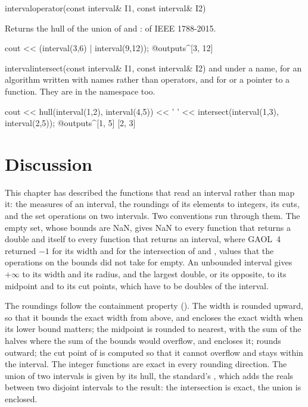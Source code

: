 \documentclass[12pt,a4paper,twoside,openright]{book}
\begin{document}
\begin{deffun}{interval}{operator\textbar}{(const interval\& I1, const interval\& I2)}
  \begin{operation}
  \end{operation}
  Returns the hull of the union of  and : 
  of IEEE 1788-2015.
  \begin{example}
cout << (interval(3,6) | interval(9,12));
@outputs^[3, 12]~
  \end{example}
\end{deffun}

\begin{deffun}{interval}{intersect}{(const interval\& I1, const interval\& I2)}
   and  under a name, for an algorithm written
  with names rather than operators, and for  or a
  pointer to a function. They are in the namespace 
  too.\newinvfive
  \begin{example}
cout << hull(interval(1,2), interval(4,5)) << ' '
     << intersect(interval(1,3), interval(2,5));
@outputs^[1, 5] [2, 3]~
  \end{example}
\end{deffun}

\section{Discussion}

This chapter has described the functions that read an interval rather than
map it: the measures of an interval, the roundings of its elements to
integers, its cuts, and the set operations on two intervals. Two
conventions run through them. The empty set, whose bounds are NaN, gives
NaN to every function that returns a double and itself to every function
that returns an interval, where GAOL~4 returned $-1$ for its width and
 for the intersection of  and , values that
the operations on the bounds did not take for empty. An unbounded interval
gives $+\infty$ to its width and its radius, and the largest double, or its
opposite, to its midpoint and to its cut points, which have to be doubles
of the interval.

\medskip
The roundings follow the containment property ().
The width is rounded upward, so that it bounds the exact width from above,
and  encloses the exact width when its lower bound
matters; the midpoint is rounded to nearest, with the sum of the halves
where the sum of the bounds would overflow, and  encloses it;
 rounds outward; the cut point of  is
computed so that it cannot overflow and stays within the interval. The
integer functions are exact in every rounding direction. The union of two
intervals is given by its hull, the standard's , which
adds the reals between two disjoint intervals to the result: the
intersection is exact, the union is enclosed.
\end{document}

